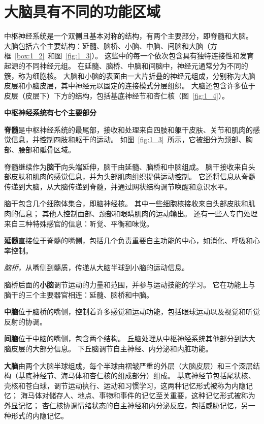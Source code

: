 \section{大脑具有不同的功能区域}

中枢神经系统是一个双侧且基本对称的结构，有两个主要部分，即脊髓和大脑。
大脑包括六个主要结构：延髓、脑桥、小脑、中脑、间脑和大脑（方框~\ref{box:1_2}~和图~\ref{fig:1_3}）。
这些中的每一个依次包含具有独特连接性和发育起源的不同神经元组。
在延髓、脑桥、中脑和间脑中，神经元通常分为不同的簇，称为细胞核。
大脑和小脑的表面由一大片折叠的神经元组成，分别称为大脑皮层和小脑皮层，其中神经元以固定的连接模式分层组织。
大脑还包含许多位于皮层（皮层下）下方的结构，包括基底神经节和杏仁核（图~\ref{fig:1_4}）。


\begin{proposition}[中枢神经系统的解剖学组织] \label{box:1_2}
	\textbf{中枢神经系统有七个主要部分}
	
	\quad \quad \textbf{脊髓}是中枢神经系统的最尾部，接收和处理来自四肢和躯干皮肤、关节和肌肉的感觉信息，并控制四肢和躯干的运动。
	如图~\ref{fig:1_3}~所示，它被细分为颈部、胸部、腰部和骶骨区域。
	
	\quad \quad 脊髓继续作为\textbf{脑干}向头端延伸，脑干由延髓、脑桥和中脑组成。
	脑干接收来自头部皮肤和肌肉的感觉信息，并为头部肌肉组织提供运动控制。
	它还将信息从脊髓传递到大脑，从大脑传递到脊髓，并通过网状结构调节唤醒和意识水平。
	
	\quad \quad 脑干包含几个细胞体集合，即脑神经核。
	其中一些细胞核接收来自头部皮肤和肌肉的信息；
	其他人控制面部、颈部和眼睛肌肉的运动输出。
	还有一些人专门处理来自三种特殊感官的信息：听觉、平衡和味觉。
	
	\quad \quad \textbf{延髓}直接位于脊髓的嘴侧，包括几个负责重要自主功能的中心，如消化、呼吸和心率控制。
	
	\quad \quad \textit{脑桥}，从嘴侧到髓质，传递从大脑半球到小脑的运动信息。
	
	\quad \quad 脑桥后面的\textbf{小脑}调节运动的力量和范围，并参与运动技能的学习。
	它在功能上与脑干的三个主要器官相连：延髓、脑桥和中脑。
	
	\quad \quad \textbf{中脑}位于脑桥的嘴侧，控制着许多感觉和运动功能，包括眼球运动以及视觉和听觉反射的协调。
	
	\quad \quad \textbf{间脑}位于中脑的嘴侧，包含两个结构。
	丘脑处理从中枢神经系统其他部分到达大脑皮层的大部分信息。
	下丘脑调节自主神经、内分泌和内脏功能。
	
	\quad \quad \textbf{大脑}由两个大脑半球组成，每个半球由褶皱严重的外层（大脑皮层）和三个深层结构（基底神经节、海马体和杏仁核的组成部分）组成。
	基底神经节包括尾状核、壳核和苍白球，调节运动执行、运动和习惯学习，这两种记忆形式被称为内隐记忆；
	海马体对储存人、地点、事物和事件的记忆至关重要，这种记忆形式被称为外显记忆；
	杏仁核协调情绪状态的自主神经和内分泌反应，包括威胁记忆，另一种形式的内隐记忆。
	

\end{proposition}
